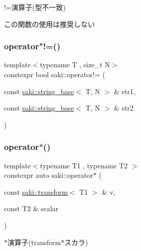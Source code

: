 !=演算子(型不一致) 

この関数の使用は推奨しない \mbox{\label{namespacesaki_a97d9fc5d2082989be021e821379631d0}} 
\subsubsection{\texorpdfstring{operator"!=()}{operator!=()}\hspace{0.1cm}{\footnotesize\ttfamily [14/14]}}
{\footnotesize\ttfamily template$<$typename T , size\+\_\+t N$>$ \\
constexpr bool saki\+::operator!= (\begin{DoxyParamCaption}\item[{const \mbox{\hyperlink{classsaki_1_1string__base}{saki\+::string\+\_\+base}}$<$ T, N $>$ \&}]{str1,  }\item[{const \mbox{\hyperlink{classsaki_1_1string__base}{saki\+::string\+\_\+base}}$<$ T, N $>$ \&}]{str2 }\end{DoxyParamCaption})}

\mbox{\label{namespacesaki_ab9612151e27555ea59013c6a7da3322d}} 
\subsubsection{\texorpdfstring{operator$\ast$()}{operator*()}\hspace{0.1cm}{\footnotesize\ttfamily [1/14]}}
{\footnotesize\ttfamily template$<$typename T1 , typename T2 $>$ \\
constexpr auto saki\+::operator$\ast$ (\begin{DoxyParamCaption}\item[{const \mbox{\hyperlink{classsaki_1_1transform}{saki\+::transform}}$<$ T1 $>$ \&}]{v,  }\item[{const T2 \&}]{scalar }\end{DoxyParamCaption})}



$\ast$演算子(transform$\ast$スカラ) 

\mbox{\label{namespacesaki_abd9716c5a5ccdc1cafb975df8897acb3}} 
